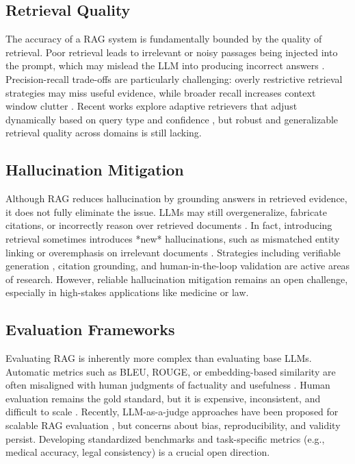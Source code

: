 \documentclass[conference]{IEEEtran}
\begin{document}
\subsection{Retrieval Quality}
The accuracy of a RAG system is fundamentally bounded by the quality of retrieval. Poor retrieval leads to irrelevant or noisy passages being injected into the prompt, which may mislead the LLM into producing incorrect answers \cite{gao2023retrievalsurvey}. Precision-recall trade-offs are particularly challenging: overly restrictive retrieval strategies may miss useful evidence, while broader recall increases context window clutter \cite{lewis2020rag}. Recent works explore adaptive retrievers that adjust dynamically based on query type and confidence \cite{izacard2022atlas}, but robust and generalizable retrieval quality across domains is still lacking.

\subsection{Hallucination Mitigation}
Although RAG reduces hallucination by grounding answers in retrieved evidence, it does not fully eliminate the issue. LLMs may still overgeneralize, fabricate citations, or incorrectly reason over retrieved documents \cite{ji2023survey}. In fact, introducing retrieval sometimes introduces *new* hallucinations, such as mismatched entity linking or overemphasis on irrelevant documents \cite{shen2023surveyhallucination}. Strategies including verifiable generation \cite{min2023factscore}, citation grounding, and human-in-the-loop validation are active areas of research. However, reliable hallucination mitigation remains an open challenge, especially in high-stakes applications like medicine or law.

\subsection{Evaluation Frameworks}
Evaluating RAG is inherently more complex than evaluating base LLMs. Automatic metrics such as BLEU, ROUGE, or embedding-based similarity are often misaligned with human judgments of factuality and usefulness \cite{liu2023ragmetrics}. Human evaluation remains the gold standard, but it is expensive, inconsistent, and difficult to scale \cite{chang2023surveyllm}. Recently, LLM-as-a-judge approaches have been proposed for scalable RAG evaluation \cite{zhou2023llmjudge}, but concerns about bias, reproducibility, and validity persist. Developing standardized benchmarks and task-specific metrics (e.g., medical accuracy, legal consistency) is a crucial open direction.
\end{document}
